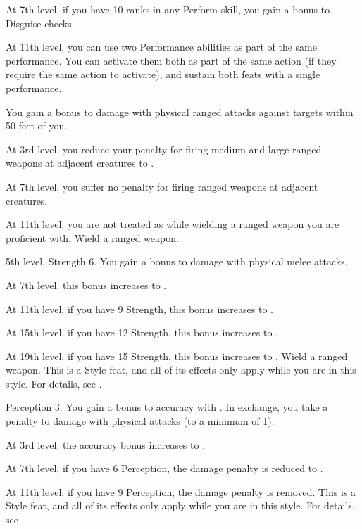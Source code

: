     At 7th level, if you have 10 ranks in any Perform skill, you gain a  bonus to Disguise checks.

    At 11th level, you can use two Performance abilities as part of the same performance.
    You can activate them both as part of the same action (if they require the same action to activate), and sustain both feats with a single performance.

    \featben You gain a  bonus to damage with physical ranged attacks against targets within 50 feet of you.

    At 3rd level, you reduce your penalty for firing medium and large ranged weapons at adjacent creatures to .

    At 7th level, you suffer no penalty for firing ranged weapons at adjacent creatures.

    At 11th level, you are not treated as  while wielding a ranged weapon you are proficient with.
    \stylereq Wield a ranged weapon.

    \featpres 5th level, Strength 6.
    \featben You gain a  bonus to damage with physical melee attacks.

    At 7th level, this bonus increases to .

    At 11th level, if you have 9 Strength, this bonus increases to .

    At 15th level, if you have 12 Strength, this bonus increases to .

    At 19th level, if you have 15 Strength, this bonus increases to .
    \stylereq Wield a ranged weapon.
     This is a Style feat, and all of its effects only apply while you are in this style.
    For details, see .

    \featpres Perception 3.
    \featben You gain a  bonus to accuracy with .
    In exchange, you take a  penalty to damage with physical attacks (to a minimum of 1).

    At 3rd level, the accuracy bonus increases to .

    At 7th level, if you have 6 Perception, the damage penalty is reduced to .

    At 11th level, if you have 9 Perception, the damage penalty is removed.
     This is a Style feat, and all of its effects only apply while you are in this style.
    For details, see .


